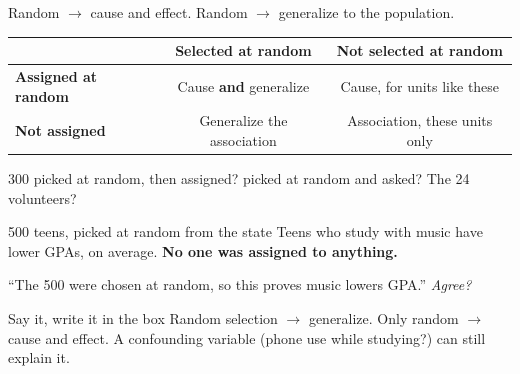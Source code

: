 \documentclass[aspectratio=169, 11pt]{beamer}
\begin{document}
\begin{frame}[t, plain]
  Random  $\to$ cause and effect. \quad Random  $\to$
  generalize to the population.
  \vspace{8pt}
  \begin{center}
  {\small\renewcommand{\arraystretch}{1.6}
  \begin{tabular}{|l|c|c|}
    \hline
    & \textbf{Selected at random} & \textbf{Not selected at random} \\ \hline
    \textbf{Assigned at random} & Cause \textbf{and} generalize & Cause, for units like these \\ \hline
    \textbf{Not assigned} & Generalize the association & Association, these units only \\ \hline
  \end{tabular}}
  \end{center}
  \vspace{4pt}
  {\small 300 picked at random, then assigned?  picked at random and asked? \quad
  The 24 volunteers?}
\end{frame}

\begin{frame}[t, plain]
  \vspace{4pt}
  \begin{block}{500 teens, picked at random from the state}
    Teens who study with music have lower GPAs, on average. \textbf{No one was assigned to
    anything.}
  \end{block}
  \vspace{6pt}
  ``The 500 were chosen at random, so this proves music lowers GPA.'' \emph{Agree?}
  \vspace{8pt}
  \begin{block}{Say it, write it in the box}
    Random selection $\to$ generalize. Only random  $\to$ cause and effect.
    A confounding variable (phone use while studying?) can still explain it.
  \end{block}
\end{frame}
\end{document}
